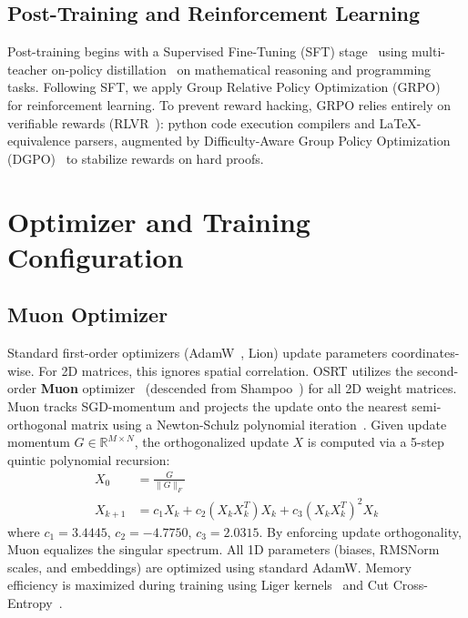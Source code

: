 \documentclass[11pt,twocolumn]{article}
\begin{document}
\subsection{Post-Training and Reinforcement Learning}
Post-training begins with a Supervised Fine-Tuning (SFT) stage~\cite{instructgpt2022} using multi-teacher on-policy distillation~\cite{kd2015} on mathematical reasoning and programming tasks. Following SFT, we apply Group Relative Policy Optimization (GRPO)~\cite{grpo2024} for reinforcement learning. To prevent reward hacking, GRPO relies entirely on verifiable rewards (RLVR~\cite{tulu32024,longrlvr2026}): python code execution compilers and LaTeX-equivalence parsers, augmented by Difficulty-Aware Group Policy Optimization (DGPO)~\cite{dgpo2026} to stabilize rewards on hard proofs.

\section{Optimizer and Training Configuration}

\subsection{Muon Optimizer}
Standard first-order optimizers (AdamW~\cite{adamw2017}, Lion) update parameters coordinates-wise. For 2D matrices, this ignores spatial correlation. OSRT utilizes the second-order \textbf{Muon} optimizer~\cite{muon2024,moonlight2025} (descended from Shampoo~\cite{shampoo2018}) for all 2D weight matrices. Muon tracks SGD-momentum and projects the update onto the nearest semi-orthogonal matrix using a Newton-Schulz polynomial iteration~\cite{kim2026}. Given update momentum $G \in \mathbb{R}^{M \times N}$, the orthogonalized update $X$ is computed via a 5-step quintic polynomial recursion:
\begin{align}
X_0 &= \frac{G}{\|G\|_F} \\
X_{k+1} &= c_1 X_k + c_2 (X_k X_k^T) X_k + c_3 (X_k X_k^T)^2 X_k
\end{align}
where $c_1 = 3.4445$, $c_2 = -4.7750$, $c_3 = 2.0315$. By enforcing update orthogonality, Muon equalizes the singular spectrum. All 1D parameters (biases, RMSNorm scales, and embeddings) are optimized using standard AdamW. Memory efficiency is maximized during training using Liger kernels~\cite{liger2024} and Cut Cross-Entropy~\cite{cutce2024}.
\end{document}
